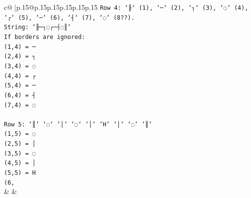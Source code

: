 \documentclass{article}
\begin{document}
{\begin{supertabular}{c@{$\;$}|p{.15\linewidth}@{}p{.15\linewidth}p{.15\linewidth}p{.15\linewidth}p{.15\linewidth}p{.15\linewidth}}
{{{\texttt{Row 4: `╟` (1), `─` (2), `┐` (3), `◌` (4), `┌` (5), `─` (6), `┤` (7), `◌` (8??).} \\
\texttt{String: `╟─┐◌┌─┤◌║`} \\
\texttt{If borders are ignored:} \\
\texttt{(1,4) = ─} \\
\texttt{(2,4) = ┐} \\
\texttt{(3,4) = ◌} \\
\texttt{(4,4) = ┌} \\
\texttt{(5,4) = ─} \\
\texttt{(6,4) = ┤} \\
\texttt{(7,4) = ◌} \\
\\ 
\texttt{Row 5: `║` `◌` `│` `◌` `│` `H` `│` `◌` `║`} \\
\texttt{(1,5) = ◌} \\
\texttt{(2,5) = │} \\
\texttt{(3,5) = ◌} \\
\texttt{(4,5) = │} \\
\texttt{(5,5) = H} \\
\texttt{(6,} \\
            }
        }
    }
    & & \\ \\


\end{supertabular}}
\end{document}
